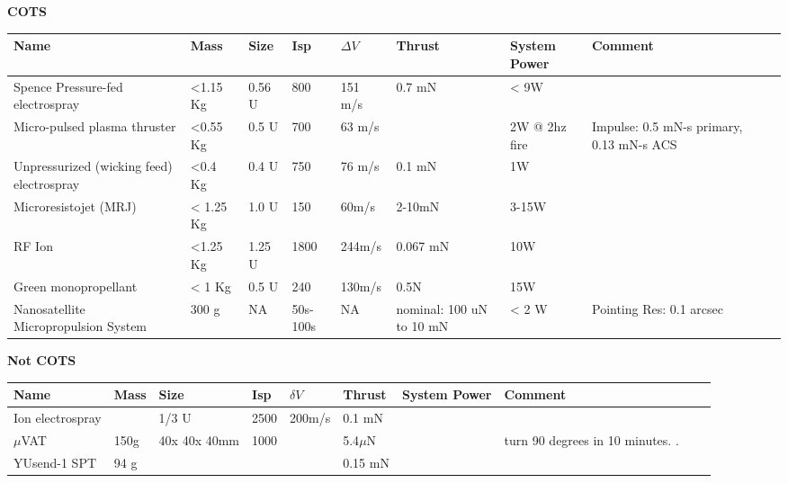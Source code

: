 {\bf COTS}
\begin{center}
     \begin{tabular}{ |p{2cm} | p{1cm} | p{1cm} |  p{1cm} | l | p{2cm} | l | p{4cm} | p{1cm} | p{3cm} |  }
     \hline

       {\bf Name} & {\bf Mass} & {\bf Size} & {\bf Isp} & {\bf $\Delta V$} & {\bf Thrust} & {\bf System Power}&{\bf Comment}  \\ \hline


     Spence Pressure-fed electrospray \cite{Spence} & <1.15 Kg& 0.56 U& 800 & 151 m/s & 0.7 mN &< 9W &   \\ \hline

     Micro-pulsed plasma thruster \cite{Spence} & <0.55 Kg& 0.5 U & 700 & 63 m/s&  & 2W @ 2hz fire &  Impulse: 0.5 mN-s primary, 0.13 mN-s ACS\\ \hline

     Unpressurized (wicking feed) electrospray \cite{Spence} & <0.4 Kg& 0.4 U& 750 & 76 m/s & 0.1 mN & 1W &  \\
     \hline

     Microresistojet (MRJ) \cite{Spence} & < 1.25 Kg& 1.0 U&150 & 60m/s & 2-10mN & 3-15W&   \\
     \hline

     RF Ion \cite{Spence} & <1.25 Kg& 1.25 U& 1800 & 244m/s & 0.067 mN &10W &   \\
     \hline

     Green monopropellant \cite{Spence} & < 1 Kg& 0.5 U& 240 & 130m/s & 0.5N & 15W&   \\
     \hline

	Nanosatellite Micropropulsion System \cite{Spence} & 300 g & NA &	50s-100s & NA & nominal: 100 uN to 10 mN & < 2 W & Pointing Res: 0.1 arcsec \\ \hline

     \end{tabular}
\end{center}


{\bf Not COTS}
\begin{center}
     \begin{tabular}{ |p{2cm} | p{1cm} | p{1cm} |  p{1cm} | l | l | l | p{5cm} | p{1cm} | p{2cm} |  }
     \hline

       {\bf Name} & {\bf Mass} & {\bf Size} & {\bf Isp} & {\bf $\delta V$} & {\bf Thrust} & {\bf System Power}&{\bf Comment}  \\ \hline

     Ion electrospray \cite{Ref:thr9} & & 1/3 U & 2500 & 200m/s & 0.1 mN& & \\ \hline
     {$\mu$}VAT&150g& 40x 40x 40mm & 1000&   & 5.4{$\mu$}N& & turn 90 degrees in 10 minutes. .\\ \hline
     YUsend-1 SPT \cite{Ref:thr10} &94 g &   &   &   & 0.15 mN& & \\ \hline
     \end{tabular}
\end{center}



